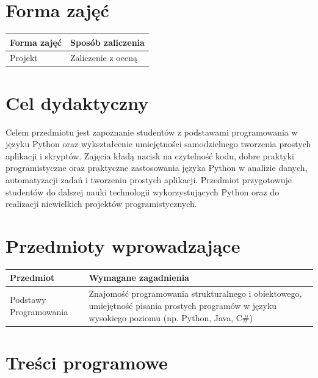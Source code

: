 \documentclass[12pt, a4paper]{article}
\begin{document}
\section{Forma zajęć}

\begin{tabular}{ll}
  \hline
  \textbf{Forma zajęć} & \textbf{Sposób zaliczenia} \\
  \hline
  Projekt & Zaliczenie z oceną \\
  \hline
\end{tabular}

\section{Cel dydaktyczny}

Celem przedmiotu jest zapoznanie studentów z podstawami programowania w języku Python oraz wykształcenie umiejętności samodzielnego tworzenia prostych aplikacji i skryptów. Zajęcia kładą nacisk na czytelność kodu, dobre praktyki programistyczne oraz praktyczne zastosowania języka Python w analizie danych, automatyzacji zadań i tworzeniu prostych aplikacji. Przedmiot przygotowuje studentów do dalszej nauki technologii wykorzystujących Python oraz do realizacji niewielkich projektów programistycznych.

\section{Przedmioty wprowadzające}

\begin{tabularx}{\textwidth}{lX}
  \hline
  \textbf{Przedmiot} & \textbf{Wymagane zagadnienia} \\
  \hline
  Podstawy Programowania & Znajomość programowania strukturalnego i obiektowego, umiejętność pisania prostych programów w języku wysokiego poziomu (np. Python, Java, C\#) \\
  \hline
\end{tabularx}

\section{Treści programowe}
\end{document}
